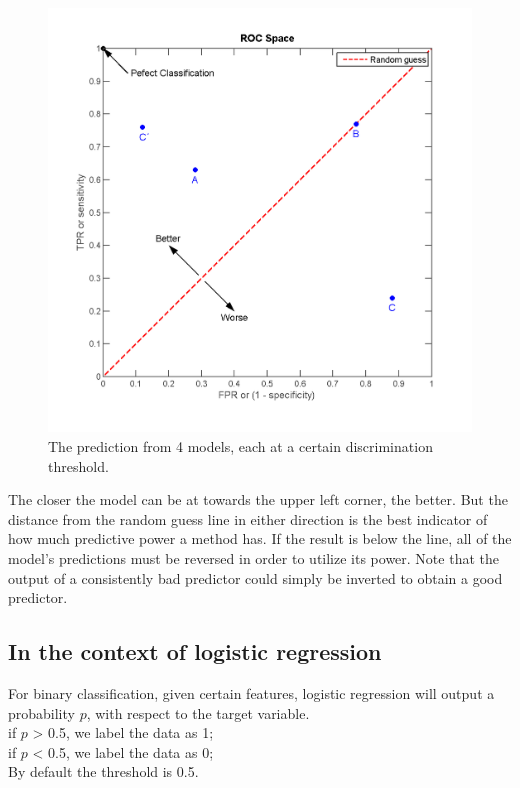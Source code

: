 \begin{figure}[h!]
\begin{center}
	\includegraphics[scale=0.5]{ROC_space.png}
	\caption[]{The prediction from 4 models, each at a certain discrimination threshold.}
	\label{precisionrecall}
	\end{center}
	\end{figure}
	
The closer the model can be at towards the upper left corner, the better. But the distance from the random guess line in either direction is the best indicator of how much predictive power a method has. If the result is below the line, all of the model's predictions must be reversed in order to utilize its power. Note that the output of a consistently bad predictor could simply be inverted to obtain a good predictor.

\subsection{In the context of logistic regression}

For binary classification, given certain features, logistic regression will output a probability $p$, with respect to the target variable.\\
if $p$ > 0.5, we label the data as 1;\\
if $p$ < 0.5, we label the data as 0;\\
By default the threshold is 0.5.\\

